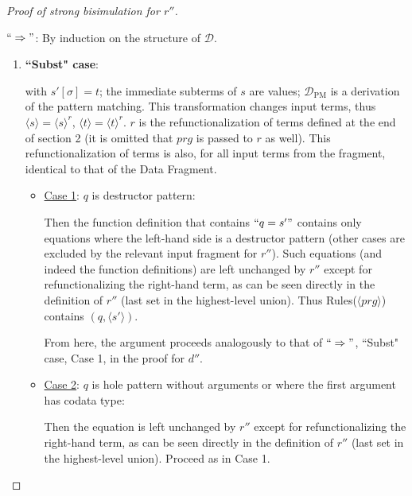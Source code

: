 \documentclass[11pt]{article} %
\begin{document}
\begin{proof}[Proof of strong bisimulation for $r''$] ~

$`` \Rightarrow "$: By induction on the structure of $\mathcal{D}$.

\begin{enumerate}
\item \textbf{``Subst" case}:

\begin{prooftree}
\end{prooftree}

with $s'[\sigma] = t$; the immediate subterms of $s$ are values; $\mathcal{D}_{\textrm{PM}}$ is a derivation of the pattern matching. This transformation changes input terms, thus $\langle s \rangle = \langle s \rangle^r$, $\langle t \rangle = \langle t \rangle^r$. $r$ is the refunctionalization of terms defined at the end of section 2 (it is omitted that $prg$ is passed to $r$ as well). This refunctionalization of terms is also, for all input terms from the fragment, identical to that of the Data Fragment.

\begin{itemize}

\item \underline{Case 1}: $q$ is destructor pattern:

Then the function definition that contains $`` q = s' "$ contains only equations where the left-hand side is a destructor pattern (other cases are excluded by the relevant input fragment for $r''$). Such equations (and indeed the function definitions) are left unchanged by $r''$ except for refunctionalizing the right-hand term, as can be seen directly in the definition of $r''$ (last set in the highest-level union). Thus Rules($\langle prg \rangle$) contains $(q, \langle s' \rangle)$.

From here, the argument proceeds analogously to that of $`` \Rightarrow "$, ``Subst" case, Case 1, in the proof for $d''$.

\item \underline{Case 2}: $q$ is hole pattern without arguments or where the first argument has codata type:

Then the equation is left unchanged by $r''$ except for refunctionalizing the right-hand term, as can be seen directly in the definition of $r''$ (last set in the highest-level union). Proceed as in Case 1.


\end{itemize}
\end{enumerate}
\end{proof}
\end{document}
